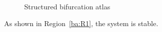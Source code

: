 \documentclass{article}
\begin{document}
\begin{figure}
\centering
%

\caption{Structured bifurcation atlas}

\end{figure}

As shown in Region~\ref{ba:R1}, the system is stable.
\end{document}
